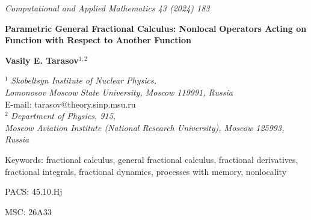 \documentclass[12pt]{article}
\begin{document}

\begin{center}

\textit{Computational and Applied Mathematics 43 (2024) 183}

\vskip 7mm

{\bf \large Parametric General Fractional Calculus: Nonlocal} 
\vskip 3mm
{\bf \large 
Operators Acting on Function with Respect to Another Function}
\vskip 3mm


\vskip 7mm
{\bf \large Vasily E. Tarasov}$^{1,2}$ \\
\vskip 3mm

${}^1$ {\it Skobeltsyn Institute of Nuclear Physics, \\ 
Lomonosov Moscow State University, Moscow 119991, Russia} \\
{E-mail: tarasov@theory.sinp.msu.ru} \\

${}^2$ {\it
Department of Physics, 915, \\ 
Moscow Aviation Institute (National Research University),
Moscow 125993, Russia } \\


\begin{abstract} 
In this paper, we present the definitions and some properties of the general fractional integrals (GFIs) and 
general fractional derivatives (GFDs) of a function f(x) with respect to another function g(x).
Examples of special cases of parametric GF operators are described.
Some properties of the parametric GFIs and the parametric GFDs are proved.
Representation of the parametric GFIs and parametric GFDs via the GF integrals on the finite interval (a,b).
Fundamental theorems of parametric GFC are proved.
Applied mathematical interpretations of parametric general fractional derivatives for processes with memory are given.
\end{abstract}


\end{center}

Keywords: fractional calculus, general fractional calculus,
fractional derivatives, fractional integrals, fractional dynamics, processes with memory, nonlocality


PACS: 45.10.Hj 

MSC: 26A33


\end{document}
